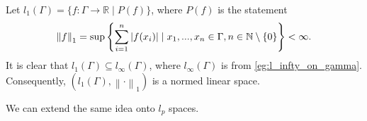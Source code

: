 \documentclass[notoc,notitlepage]{tufte-book}
\newcommand{\norm}[1]{\left\| #1 \right\|}
\begin{document}
\begin{eg}
  Let $l_1(\Gamma) = \{ f : \Gamma \to \mathbb{R} \mid P(f) \}$, where $P(f)$ is the statement
  \begin{equation*}
    \norm{f}_1 = \sup \left\{ \sum_{i=1}^{n} \abs{f(x_i)} \mid x_1, ..., x_n \in \Gamma, n \in \mathbb{N} \setminus \{ 0 \} \right\} < \infty.
  \end{equation*}
  It is clear that $l_1(\Gamma) \subseteq l_\infty(\Gamma)$, where $l_\infty(\Gamma)$ is from \cref{eg:l_infty_on_gamma}. Consequently, $(l_1(\Gamma), \norm\cdot_1)$ is a normed linear space.
\end{eg}

We can extend the same idea onto $l_p$ spaces.
\end{document}
